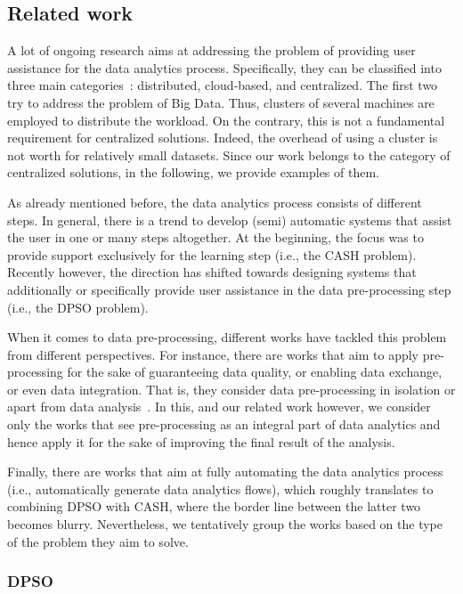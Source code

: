 \subsection{Related work}
\label{ssec:relatedwork}
A lot of ongoing research aims at addressing the problem of providing user assistance for the data analytics process.
Specifically, they can be classified into three main categories~\cite{elshawi2019automated}: distributed, cloud-based, and centralized. The first two try to address the problem of Big Data. Thus, clusters of several machines are employed to distribute the workload. On the contrary, this is not a fundamental requirement for centralized solutions. Indeed, the overhead of using a cluster is not worth for relatively small datasets. 
Since our work belongs to the category of centralized solutions, in the following, we provide examples of them.

As already mentioned before, the data analytics process consists of different steps. In general, there is a trend to develop (semi) automatic systems that assist the user in one or many steps altogether. At the beginning, the focus was to provide support exclusively for the learning step (i.e., the CASH problem). Recently however, the direction has shifted towards designing systems that additionally or specifically provide user assistance in the data pre-processing step (i.e., the DPSO problem).

When it comes to data pre-processing, different works have tackled this problem from different perspectives. For instance, there are works that aim to apply pre-processing for the sake of guaranteeing data quality, or enabling data exchange, or even data integration. That is, they consider data pre-processing in isolation or apart from data analysis~\cite{Llunatic13VLDBEnd,BigDansing15SIGMOD,Katara15SIGMOD,Foofah17SIGMOD}. In this, and our related work however, we consider only the works that see pre-processing as an integral part of data analytics and hence apply it for the sake of improving the final result of the analysis.


Finally, there are works that aim at fully automating the data analytics process (i.e., automatically generate data analytics flows), which roughly translates to combining DPSO with CASH, where the border line between the latter two becomes blurry. Nevertheless, we tentatively group the works based on the type of the problem they aim to solve.

\subsubsection{DPSO}

